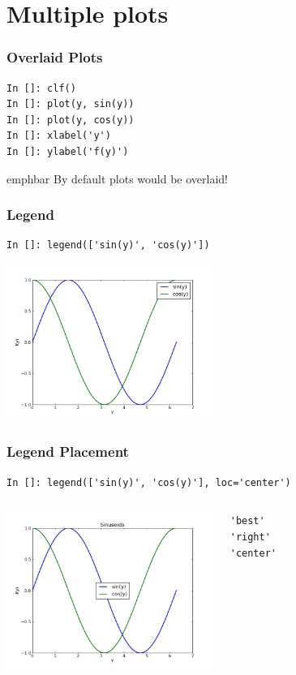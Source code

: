 \documentclass[14pt,compress]{beamer}
\newcommand{\emphbar}[1]
{\begin{beamercolorbox}[rounded=true]{emphbar} 
      {#1}
 \end{beamercolorbox}
}
\begin{document}
\section{Multiple plots}
\begin{frame}[fragile]
\frametitle{Overlaid Plots}
\begin{lstlisting}
In []: clf()
In []: plot(y, sin(y))
In []: plot(y, cos(y))
In []: xlabel('y')
In []: ylabel('f(y)')
\end{lstlisting}
\emphbar{By default plots would be overlaid!}
\end{frame}

\begin{frame}[fragile]
\frametitle{Legend}
\vspace*{-0.15in}
\begin{lstlisting}
In []: legend(['sin(y)', 'cos(y)']) 
\end{lstlisting}
  \vspace*{-0.1in}
  \begin{center}
  \includegraphics[height=2in, interpolate=true]{data/legend}  
  \end{center}
\end{frame}

\begin{frame}[fragile]
\frametitle{Legend Placement}
\begin{block}{}
    \small
\begin{lstlisting}
In []: legend(['sin(y)', 'cos(y)'], loc='center')
\end{lstlisting}
\end{block}

\begin{columns}
 \includegraphics[height=2in, interpolate=true]{data/position}  
\vspace{-0.2in}
\begin{lstlisting}
'best' 
'right'
'center'
\end{lstlisting}
\end{columns}
\end{frame}
\end{document}
